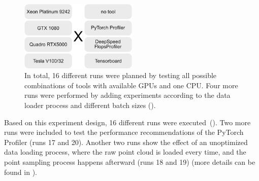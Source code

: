 \documentclass[12pt, a4paper, hidelinks]{article}
\begin{document}
\begin{figure}[H]
\centering
\includegraphics[width=0.5\textwidth]{./assets/experiments.png}
\caption[Overview of the runs]{In total, 16 different runs were planned by testing all possible combinations of tools with available \ac{GPU}s and one \ac{CPU}. Four more runs were performed by adding experiments according to the data loader process and different batch sizes ().}
\label{fig:experiments}
\end{figure}

Based on this experiment design, 16 different runs were executed~().
Two more runs were included to test the performance recommendations of the PyTorch Profiler (runs 17 and 20).
Another two runs show the effect of an unoptimized data loading process, where the raw point cloud is loaded every time, and the point sampling process happens afterward (runs 18 and 19) (more details can be found in ).
\end{document}
